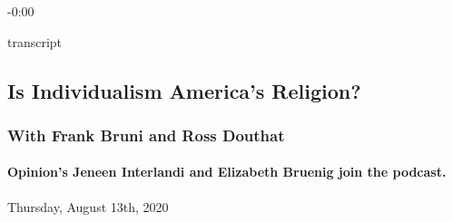 -0:00

transcript

\hypertarget{is-individualism-americas-religion-2}{%
\subsection{Is Individualism America's
Religion?}\label{is-individualism-americas-religion-2}}

\hypertarget{with-frank-bruni-and-ross-douthat-1}{%
\subsubsection{With Frank Bruni and Ross
Douthat}\label{with-frank-bruni-and-ross-douthat-1}}

\hypertarget{opinions-jeneen-interlandi-and-elizabeth-bruenig-join-the-podcast-2}{%
\paragraph{Opinion's Jeneen Interlandi and Elizabeth Bruenig join the
podcast.}\label{opinions-jeneen-interlandi-and-elizabeth-bruenig-join-the-podcast-2}}

Thursday, August 13th, 2020

